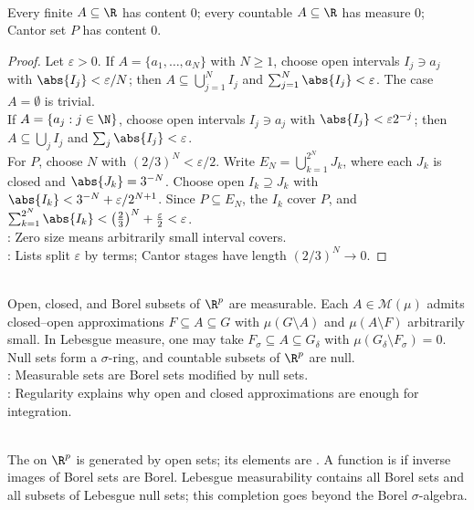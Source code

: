 \begin{proposition} \label{prop:finite-countable-cantor-null-sets} \\
Every finite $A\subseteq\R$ has content $0$; every countable $A\subseteq\R$ has measure $0$; Cantor set $P$ has content $0$.
\begin{proof}
Let $\varepsilon>0$. If $A=\{a_1,\ldots,a_N\}$ with $N\geq1$, choose open intervals $I_j\ni a_j$ with $\abs{I_j}<\varepsilon/N$; then $A\subseteq\bigcup_{j=1}^NI_j$ and $\sum_{j=1}^N\abs{I_j}<\varepsilon$. The case $A=\emptyset$ is trivial.\\
If $A=\{a_j:j\in\N\}$, choose open intervals $I_j\ni a_j$ with $\abs{I_j}<\varepsilon 2^{-j}$; then $A\subseteq\bigcup_jI_j$ and $\sum_j\abs{I_j}<\varepsilon$.\\
For $P$, choose $N$ with $(2/3)^N<\varepsilon/2$. Write $E_N=\bigcup_{k=1}^{2^N}J_k$, where each $J_k$ is closed and $\abs{J_k}=3^{-N}$. Choose open $I_k\supseteq J_k$ with $\abs{I_k}<3^{-N}+\varepsilon/2^{N+1}$. Since $P\subseteq E_N$, the $I_k$ cover $P$, and $\sum_{k=1}^{2^N}\abs{I_k}<\left(\frac23\right)^N+\frac{\varepsilon}{2}<\varepsilon$.\\
: Zero size means arbitrarily small interval covers.\\
: Lists split $\varepsilon$ by terms; Cantor stages have length $(2/3)^N\to0$.
\end{proof}
\end{proposition}

\begin{remark} \label{rem:borel-null-regular-measurable-sets} \\
Open, closed, and Borel subsets of $\R^p$ are measurable. Each $A\in\mathcal{M}(\mu)$ admits closed--open approximations $F\subseteq A\subseteq G$ with $\mu(G\setminus A)$ and $\mu(A\setminus F)$ arbitrarily small. In Lebesgue measure, one may take $F_\sigma\subseteq A\subseteq G_\delta$ with $\mu(G_\delta\setminus F_\sigma)=0$. Null sets form a $\sigma$-ring, and countable subsets of $\R^p$ are null.\\
: Measurable sets are Borel sets modified by null sets.\\
: Regularity explains why open and closed approximations are enough for integration.
\end{remark}

\begin{definition} \label{def:borel-and-lebesgue-measurability} \\
The  on $\R^p$ is generated by open sets; its elements are . A function is  if inverse images of Borel sets are Borel. Lebesgue measurability contains all Borel sets and all subsets of Lebesgue null sets; this completion goes beyond the Borel $\sigma$-algebra.
\end{definition}


